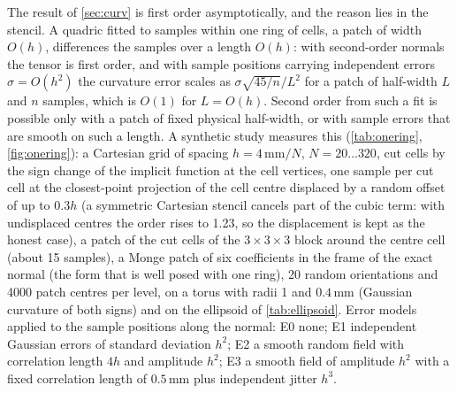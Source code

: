 \documentclass[preprint,12pt]{elsarticle}
\begin{document}
The result of \cref{sec:curv} is first order asymptotically, and the reason lies in the stencil. A quadric fitted to samples within one ring of cells, a patch of width $O(h)$, differences the samples over a length $O(h)$: with second-order normals the tensor is first order, and with sample positions carrying independent errors $\sigma = O(h^2)$ the curvature error scales as $\sigma\sqrt{45/n}/L^2$ for a patch of half-width $L$ and $n$ samples, which is $O(1)$ for $L = O(h)$. Second order from such a fit is possible only with a patch of fixed physical half-width, or with sample errors that are smooth on such a length. A synthetic study measures this (\cref{tab:onering}, \cref{fig:onering}): a Cartesian grid of spacing $h = 4\,\mathrm{mm}/N$, $N = 20 \ldots 320$, cut cells by the sign change of the implicit function at the cell vertices, one sample per cut cell at the closest-point projection of the cell centre displaced by a random offset of up to $0.3h$ (a symmetric Cartesian stencil cancels part of the cubic term: with undisplaced centres the order rises to 1.23, so the displacement is kept as the honest case), a patch of the cut cells of the $3\times3\times3$ block around the centre cell (about 15 samples), a Monge patch of six coefficients in the frame of the exact normal (the form that is well posed with one ring), 20 random orientations and 4000 patch centres per level, on a torus with radii 1 and $0.4\,\mathrm{mm}$ (Gaussian curvature of both signs) and on the ellipsoid of \cref{tab:ellipsoid}. Error models applied to the sample positions along the normal: E0 none; E1 independent Gaussian errors of standard deviation $h^2$; E2 a smooth random field with correlation length $4h$ and amplitude $h^2$; E3 a smooth field of amplitude $h^2$ with a fixed correlation length of $0.5\,\mathrm{mm}$ plus independent jitter $h^3$.

\begin{table}[htbp]
\centering
\caption{The one-ring quadratic fit on the torus and the ellipsoid: root-mean-square curvature error relative to the root mean square of the exact curvature, and the position error (root-mean-square distance of the fitted surface from the exact one at the centre, in mm), against the cell size; orders over the three finest levels. E2 shows the same orders as E1 (curvature error 0.47 of the exact root mean square, order 0.0). Two rings (about 50 samples): E0 1.55, E1 0.07, E3 1.80. E1 does not converge because its sample errors, of size $h^2$ and independent per cell, are differenced by the fit over a patch of width $O(h)$: the curvature error $\sigma\sqrt{45/n}/L^2$ of the text is $O(1)$ for $\sigma = h^2$ and $L = O(h)$ at every refinement. Scripts in the archived data \citep{LeiaRepo2026}.}
\label{tab:onering}
\small

\end{table}
\end{document}
